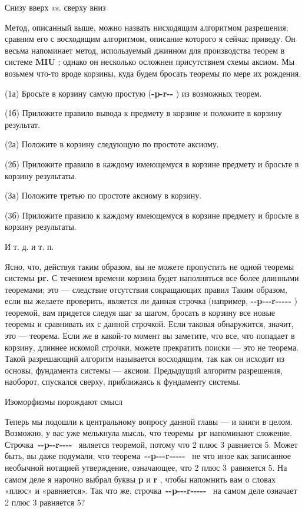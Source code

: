 Снизу вверх \emph{vs.} сверху вниз

Метод, описанный выше, можно назвать нисходящим алгоритмом разрешения; сравним его с восходящим алгоритмом, описание которого я сейчас приведу. Он весьма напоминает метод, используемый джинном для производства теорем в системе \textbf{MIU} ; однако он несколько осложнен присутствием схемы аксиом. Мы возьмем что-то вроде корзины, куда будем бросать теоремы по мере их рождения.

(1а) Бросьте в корзину самую простую (\textbf{-p-r-\/-} ) из возможных теорем.

(1б) Приложите правило вывода к предмету в корзине и положите в корзину результат.

(2а) Положите в корзину следующую по простоте аксиому.

(2б) Приложите правило в каждому имеющемуся в корзине предмету и бросьте в корзину результаты.

(За) Положите третью по простоте аксиому в корзину.

(3б) Приложите правило к каждому имеющемуся в корзине предмету и бросьте в корзину результаты.

И т. д. и т. п.

Ясно, что, действуя таким образом, вы не можете пропустить не одной теоремы системы \textbf{pr.} С течением времени корзина будет наполняться все более длинными теоремами; это --- следствие отсутствия сокращающих правил Таким образом, если вы желаете проверить, является ли данная строчка (например, \textbf{-\/-p-\/-\/-r-\/-\/-\/-\/-} ) теоремой, вам придется следуя шаг за шагом, бросать в корзину все новые теоремы и сравнивать их с данной строчкой. Если таковая обнаружится, значит, это --- теорема. Если же в какой-то момент вы заметите, что все, что попадает в корзину, длиннее искомой строчки, можете прекратить поиски --- это не теорема. Такой разрешающий алгоритм называется восходящим, так как он исходит из основы, фундамента системы --- аксиом. Предыдущий алгоритм разрешения, наоборот, спускался сверху, приближаясь к фундаменту системы.

Изоморфизмы порождают смысл

Теперь мы подошли к центральному вопросу данной главы --- и книги в целом. Возможно, у вас уже мелькнула мысль, что теоремы~\textbf{pr} напоминают сложение. Строчка~\textbf{-\/-p-\/-r-\/-\/-\/-} ~является теоремой, потому что 2 плюс 3 равняется 5. Может быть, вы даже подумали, что теорема~\textbf{-\/-p-\/-\/-r-\/-\/-\/-\/-} ~не что иное как записанное необычной нотацией утверждение, означающее, что 2 плюс 3~равняется 5. На самом деле я нарочно выбрал буквы \textbf{p} и \textbf{r} , чтобы напомнить вам о словах «плюс» и «равняется». Так что же, строчка~\textbf{-\/-p-\/-\/-r-\/-\/-\/-\/-} ~на самом деле означает 2 плюс 3 равняется 5?

